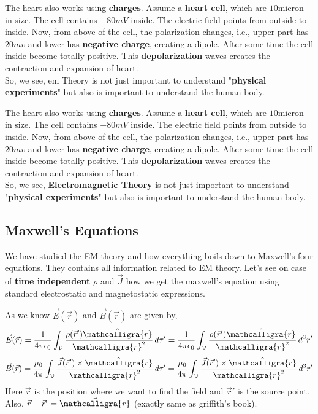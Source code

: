 \documentclass{article}
\newcommand{\scriptr}{\mathord{\mathcalligra{r}}}
\begin{document}
The heart also works using \textbf{charges}. Assume a \textbf{heart cell}, which are $10$micron in size. The cell contains $-80mV$ inside. The electric field points from outside to inside. Now, from above of the cell, the polarization changes, i.e., upper part has $20mv$ and lower has \textbf{negative charge}, creating a dipole. After some time the cell inside become totally positive. This \textbf{depolarization} waves creates the contraction and expansion of heart.\\
So, we see, \gls{em} Theory is not just important to understand "\textbf{physical experiments}" but also is important to understand the human body.

The heart also works using \textbf{charges}. Assume a \textbf{heart cell}, which are $10$micron in size. The cell contains $-80mV$ inside. The electric field points from outside to inside. Now, from above of the cell, the polarization changes, i.e., upper part has $20mv$ and lower has \textbf{negative charge}, creating a dipole. After some time the cell inside become totally positive. This \textbf{depolarization} waves creates the contraction and expansion of heart.\\
So, we see, \textbf{Electromagnetic Theory} is not just important to understand "\textbf{physical experiments}" but also is important to understand the human body.

\subsection{Maxwell's Equations}
We have studied the EM theory and how everything boils down to Maxwell's four equations. They contains all information related to EM theory. Let's see on case of \textbf{time independent} $\rho$ and $\vec{J}$ how we get the maxwell's equation using standard electrostatic and magnetostatic expressions.

As we know $\vec{E}(\vec{r})$ and $\vec{B}(\vec{r})$ are given by,
\begin{equation}
\vec{E}(\vec{r}) = \frac{1}{4\pi \epsilon_0} 
\int_{\mathcal{V}} \frac{\rho(\vec{r}')\hat{\scriptr}}{\scriptr^2} \, d\tau' = \frac{1}{4\pi \epsilon_0} 
\int_{\mathcal{V}} \frac{\rho(\vec{r}')\hat{\scriptr}}{\scriptr^2} \, d^3r'
\label{estat1}
\end{equation}
\begin{equation}
\vec{B}(\vec{r}) = \frac{\mu_0}{4\pi} 
\int_{\mathcal{V}} \frac{\vec{J}(\vec{r}')\times \hat{\scriptr}}{\scriptr^2} \, d\tau' = \frac{\mu_0}{4\pi} 
\int_{\mathcal{V}} \frac{\vec{J}(\vec{r}')\times \hat{\scriptr}}{\scriptr^2} \, d^3r'
\label{mstat1}
\end{equation}
Here $\vec{r}$ is the position where we want to find the field and $\vec{r}'$ is the source point. Also, $\vec{r}-\vec{r}'=\vec{\scriptr}$ (exactly same as griffith's book).
\end{document}
